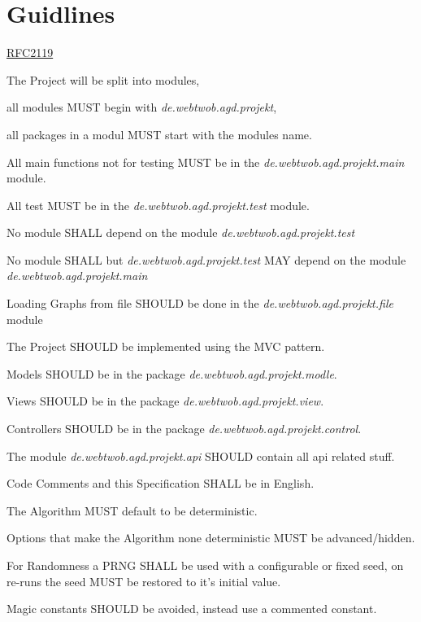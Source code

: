 \section{Guidlines}

\newcommand{\basemodule}[1][]{\textit{de.webtwob.agd.projekt#1}}

\href{https://www.ietf.org/rfc/rfc2119.txt}{RFC2119}

\begin{list}{-}{}
\item The Project will be split into modules,

all modules MUST begin with \basemodule,

all packages in a modul MUST start with the modules name.

\item All main functions not for testing MUST be in the \basemodule[.main] module.

\item All test MUST be in the \basemodule[.test] module.

\item No module SHALL depend on the module \basemodule[.test]

\item No module SHALL but  \basemodule[.test] MAY depend on the module \basemodule[.main]

\item Loading Graphs from file SHOULD be done in the \basemodule[.file] module

\item The Project SHOULD be implemented using the MVC pattern.

\item Models SHOULD be in the package \basemodule[.modle].

\item Views SHOULD be in the package \basemodule[.view].

\item Controllers SHOULD be in the package \basemodule[.control].

\item The module \basemodule[.api] SHOULD contain all api related stuff. %

\item Code Comments and this Specification SHALL be in English.

\item The Algorithm MUST default to be deterministic.

\item Options that make the Algorithm none deterministic MUST be advanced/hidden.

\item For Randomness a PRNG SHALL be used with a configurable or fixed seed,
on re-runs the seed MUST be restored to it's initial value.

\item Magic constants SHOULD be avoided, instead use a commented constant.
\end{list}
